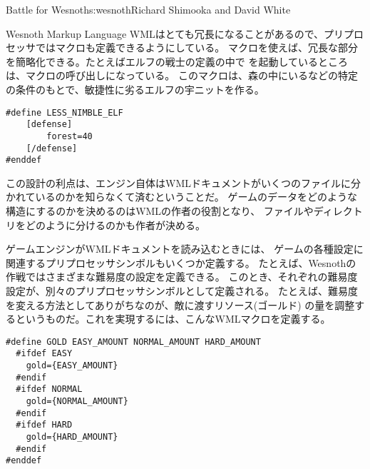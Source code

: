 \begin{aosachapter}{Battle for Wesnoth}{s:wesnoth}{Richard Shimooka and David White}
\begin{aosasect1}{Wesnoth Markup Language}
WMLはとても冗長になることがあるので、プリプロセッサではマクロも定義できるようにしている。
マクロを使えば、冗長な部分を簡略化できる。たとえばエルフの戦士の定義の中で
を起動しているところは、マクロの呼び出しになっている。
このマクロは、森の中にいるなどの特定の条件のもとで、敏捷性に劣るエルフの宇ニットを作る。

\begin{verbatim}
#define LESS_NIMBLE_ELF
    [defense]
        forest=40
    [/defense]
#enddef
\end{verbatim}

この設計の利点は、エンジン自体はWMLドキュメントがいくつのファイルに分かれているのかを知らなくて済むということだ。
ゲームのデータをどのような構造にするのかを決めるのはWMLの作者の役割となり、
ファイルやディレクトリをどのように分けるのかも作者が決める。

ゲームエンジンがWMLドキュメントを読み込むときには、
ゲームの各種設定に関連するプリプロセッサシンボルもいくつか定義する。
たとえば、Wesnothの作戦ではさまざまな難易度の設定を定義できる。
このとき、それぞれの難易度設定が、別々のプリプロセッサシンボルとして定義される。
たとえば、難易度を変える方法としてありがちなのが、敵に渡すリソース(ゴールド)
の量を調整するというものだ。これを実現するには、こんなWMLマクロを定義する。

\begin{verbatim}
#define GOLD EASY_AMOUNT NORMAL_AMOUNT HARD_AMOUNT
  #ifdef EASY
    gold={EASY_AMOUNT}
  #endif
  #ifdef NORMAL
    gold={NORMAL_AMOUNT}
  #endif
  #ifdef HARD
    gold={HARD_AMOUNT}
  #endif
#enddef
\end{verbatim}


\end{aosasect1}
\end{aosachapter}
